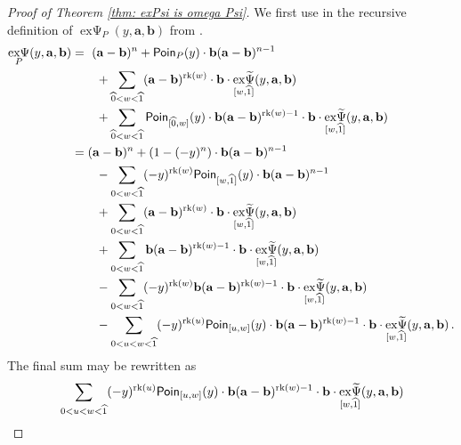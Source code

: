 \documentclass[a4paper, english,reqno, 11pt]{amsart}
\theoremstyle{plain}
\theoremstyle{definition}
\DeclareMathOperator{\rk}{rk}
\DeclareMathOperator{\expsi}{ex\Psi}
\DeclareMathOperator{\expsitilde}{ex\widetilde{\Psi}}
\newcommand{\zero}{\widehat{0}}
\newcommand{\one}{\widehat{1}}
\newcommand{\aaa}{\mathbf{a}}
\newcommand{\bbb}{\mathbf{b}}
\newcommand{\Poin}{\mathcal{\sf Poin}}
\newcommand{\elena}[1]{\todo[size=\tiny,color=pink!30]{#1 \\ \hfill --- E.}}
\begin{document}
\begin{proof}[Proof of Theorem \ref{thm: exPsi is omega Psi}]
    We first use  in the recursive definition of $\expsi_P(y,\aaa,\bbb)$ from .
    \begin{align*}
    \expsi_P (y,\aaa,\bbb)
    &= \ (\aaa - \bbb)^n + \Poin_P(y) \cdot \bbb (\aaa - \bbb)^{n-1} \\
        &\qquad+ \sum_{\zero < w < \one} 
        (\aaa - \bbb)^{\rk(w)} \cdot \bbb \cdot \expsitilde_{[w,\one]}(y,\aaa,\bbb) \\
        &\qquad + \sum_{\zero < w < \one} 
        \Poin_{[\zero,w]}(y) \cdot \bbb (\aaa - \bbb)^{\rk(w)-1} \cdot \bbb \cdot \expsitilde_{[w,\one]}(y,\aaa,\bbb) \\
        &= (\aaa - \bbb)^n + (1 - (-y)^n) \cdot \bbb(\aaa - \bbb)^{n-1} \\
        &\qquad- \sum_{0 < w <\one} (-y)^{\rk(w)} \Poin_{[w,\one]}(y) \cdot \bbb (\aaa - \bbb)^{n-1} \\
    &\qquad + \sum_{0 < w <\one} (\aaa - \bbb)^{\rk(w)}\cdot \bbb \cdot \expsitilde_{[w,\one]}(y,\aaa,\bbb) \\
    &\qquad+ \sum_{0 < w <\one} \bbb (\aaa - \bbb)^{\rk(w)-1}\cdot \bbb \cdot \expsitilde_{[w,\one]}(y,\aaa,\bbb) \\
    &\qquad - \sum_{0 < w <\one} (-y)^{\rk(w)} \bbb (\aaa - \bbb)^{\rk(w)-1}\cdot \bbb \cdot \expsitilde_{[w,\one]}(y,\aaa,\bbb) \\
    &\qquad - \sum_{0 < u < w <\one} (-y)^{\rk(u)} \Poin_{[u,w]}(y)\cdot \bbb (\aaa - \bbb)^{\rk(w)-1}\cdot \bbb \cdot \expsitilde_{[w,\one]}(y,\aaa,\bbb) \,.
    \end{align*}
    The final sum may be rewritten as
    \begin{align*}
    &\sum_{0 < u < w <\one}(-y)^{\rk(u)} \Poin_{[u,w]}(y) \cdot\bbb (\aaa - \bbb)^{\rk(w)-1}\cdot \bbb \cdot \expsitilde_{[w,\one]}(y,\aaa,\bbb)\\

\end{align*}
\end{proof}
\end{document}
